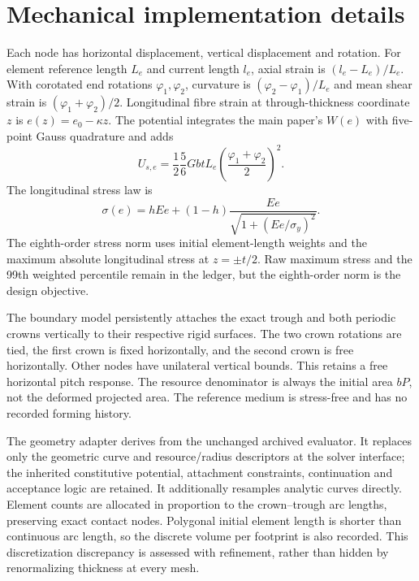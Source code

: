 \documentclass[11pt]{article}
\begin{document}
\section{Mechanical implementation details}
Each node has horizontal displacement, vertical displacement and rotation. For element reference length $L_e$ and current length $l_e$, axial strain is $(l_e-L_e)/L_e$. With corotated end rotations $\varphi_1,\varphi_2$, curvature is $(\varphi_2-\varphi_1)/L_e$ and mean shear strain is $(\varphi_1+\varphi_2)/2$. Longitudinal fibre strain at through-thickness coordinate $z$ is $e(z)=e_0-\kappa z$. The potential integrates the main paper's $W(e)$ with five-point Gauss quadrature and adds
\begin{equation}
 U_{s,e}=\frac12\frac56GbtL_e\left(\frac{\varphi_1+\varphi_2}{2}\right)^2.
\end{equation}
The longitudinal stress law is
\begin{equation}
 \sigma(e)=hEe+(1-h)\frac{Ee}{\sqrt{1+(Ee/\sigma_y)^2}}.
\end{equation}
The eighth-order stress norm uses initial element-length weights and the maximum absolute longitudinal stress at $z=\pm t/2$. Raw maximum stress and the 99th weighted percentile remain in the ledger, but the eighth-order norm is the design objective.

The boundary model persistently attaches the exact trough and both periodic crowns vertically to their respective rigid surfaces. The two crown rotations are tied, the first crown is fixed horizontally, and the second crown is free horizontally. Other nodes have unilateral vertical bounds. This retains a free horizontal pitch response. The resource denominator is always the initial area $bP$, not the deformed projected area. The reference medium is stress-free and has no recorded forming history.

The geometry adapter derives from the unchanged archived evaluator. It replaces only the geometric curve and resource/radius descriptors at the solver interface; the inherited constitutive potential, attachment constraints, continuation and acceptance logic are retained. It additionally resamples analytic curves directly. Element counts are allocated in proportion to the crown--trough arc lengths, preserving exact contact nodes. Polygonal initial element length is shorter than continuous arc length, so the discrete volume per footprint is also recorded. This discretization discrepancy is assessed with refinement, rather than hidden by renormalizing thickness at every mesh.
\end{document}
